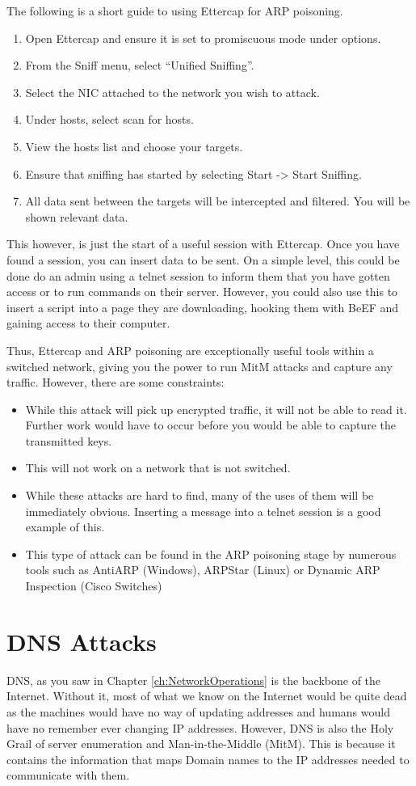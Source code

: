 		The following is a short guide to using Ettercap for ARP poisoning.
		\begin{enumerate}
			\item Open Ettercap and ensure  it is set to promiscuous mode under options.
			\item From the Sniff menu, select ``Unified Sniffing''.
			\item Select the NIC attached to the network you wish to attack.
			\item Under hosts, select scan for hosts.
			\item View the hosts list and choose your targets.
			\item Ensure that sniffing has started by selecting Start -> Start Sniffing.
			\item All data sent between the targets will be intercepted and filtered.
				You will be shown relevant data.
		\end{enumerate}
		This however, is just the start of a useful session with Ettercap.
		Once you have found a session, you can insert data to be sent.
		On a simple level, this could be done do an admin using a telnet session to inform them that you have gotten access or to run commands on their server.
		However, you could also use this to insert a script into a page they are downloading, hooking them with BeEF and gaining access to their computer.

		Thus, Ettercap and ARP poisoning are exceptionally useful tools within a switched network,
		giving you the power to run MitM attacks and capture any traffic.
		However, there are some constraints:
		\begin{itemize}
			\item While this attack will pick up encrypted traffic, it will not be able to read it.
				Further work would have to occur before you would be able to capture the transmitted keys.
			\item This will not work on a network that is not switched.
			\item While these attacks are hard to find, many of the uses of them will be immediately obvious.
				Inserting a message into a telnet session is a good example of this.
			\item This type of attack can be found in the ARP poisoning stage by numerous tools such as
				AntiARP (Windows), ARPStar (Linux) or Dynamic ARP Inspection (Cisco Switches)
		\end{itemize}
	\section{DNS Attacks}
		DNS, as you saw in Chapter \ref{ch:NetworkOperations} is the backbone of the Internet.
		Without it, most of what we know on the Internet would be quite dead as the machines would have no way of updating addresses and humans would have no remember ever changing IP addresses.
		However, DNS is also the Holy Grail of server enumeration and Man-in-the-Middle (MitM).
		This is because it contains the information that maps Domain names to the IP addresses needed to communicate with them.

